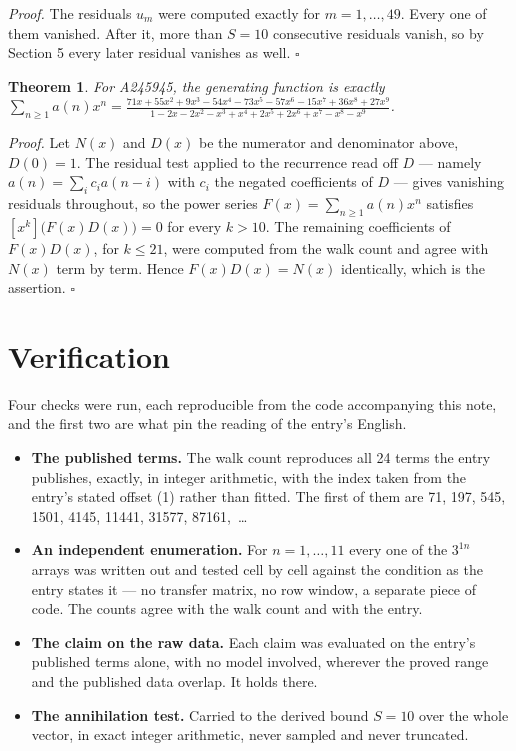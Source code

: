 \documentclass[11pt]{article}
\newtheorem{theorem}{Theorem}
\theoremstyle{definition}
\begin{document}
{\itshape Proof.} The residuals $u_m$ were computed exactly for $m = 1,\dots,49$. Every one of them vanished. After it, more than $S = 10$ consecutive residuals vanish, so by Section 5 every later residual vanishes as well. $\square$

\begin{theorem} For A245945, the generating function is exactly $\sum_{n\ge 1} a(n)x^n = \frac{71x + 55x^{2} + 9x^{3} - 54x^{4} - 73x^{5} - 57x^{6} - 15x^{7} + 36x^{8} + 27x^{9}}{1 - 2x - 2x^{2} - x^{3} + x^{4} + 2x^{5} + 2x^{6} + x^{7} - x^{8} - x^{9}}$.\end{theorem}

{\itshape Proof.} Let $N(x)$ and $D(x)$ be the numerator and denominator above, $D(0)=1$. The residual test applied to the recurrence read off $D$ --- namely $a(n) = \sum_i c_i a(n-i)$ with $c_i$ the negated coefficients of $D$ --- gives vanishing residuals throughout, so the power series $F(x)=\sum_{n\ge 1}a(n)x^n$ satisfies $[x^k]\bigl(F(x)D(x)\bigr) = 0$ for every $k > 10$. The remaining coefficients of $F(x)D(x)$, for $k \le 21$, were computed from the walk count and agree with $N(x)$ term by term. Hence $F(x)D(x) = N(x)$ identically, which is the assertion. $\square$

\section{Verification}

Four checks were run, each reproducible from the code accompanying this note, and the first two are what pin the reading of the entry's English.

\begin{itemize}

\item {\bfseries The published terms.} The walk count reproduces all 24 terms the entry publishes, exactly, in integer arithmetic, with the index taken from the entry's stated offset (1) rather than fitted. The first of them are 71, 197, 545, 1501, 4145, 11441, 31577, 87161,~\dots

\item {\bfseries An independent enumeration.} For $n = 1,\dots,11$ every one of the $3^{1n}$ arrays was written out and tested cell by cell against the condition as the entry states it --- no transfer matrix, no row window, a separate piece of code. The counts agree with the walk count and with the entry.

\item {\bfseries The claim on the raw data.} Each claim was evaluated on the entry's published terms alone, with no model involved, wherever the proved range and the published data overlap. It holds there.

\item {\bfseries The annihilation test.} Carried to the derived bound $S = 10$ over the whole vector, in exact integer arithmetic, never sampled and never truncated.

\end{itemize}
\end{document}
